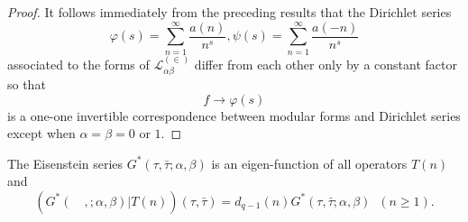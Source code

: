 \begin{proof}
It follows immediately from the preceding results that the Dirichlet
series 
$$
\varphi(s) = \sum^{\infty}_{n=1} \frac{a(n)}{n^s}, \psi(s) =
\sum^{\infty}_{n=1} \frac{a(-n)}{n^s}
$$
associated to the forms of $\mathscr{L}^{(\in)}_{\alpha\beta}$
differ from each other only by a constant factor so that 
$$
f\to \varphi(s)
$$
is a one-one invertible correspondence between modular forms and\break
Dirichlet series except when $\alpha=\beta=0$ or $1$.
\end{proof}

\begin{thm}\label{chap5:thm40}
The Eisenstein series $G^{\ast}(\tau,\bar{\tau};\alpha,\beta)$ is an
eigen-function of all operators $T(n)$ and 
$$
(G^{\ast}(\quad, ;\alpha,\beta)|T(n)) (\tau,\bar{\tau}) = d_{q-1}
(n)G^{\ast} (\tau,\bar{\tau};\alpha,\beta) \;\; (n\geq 1).
$$
\end{thm}

